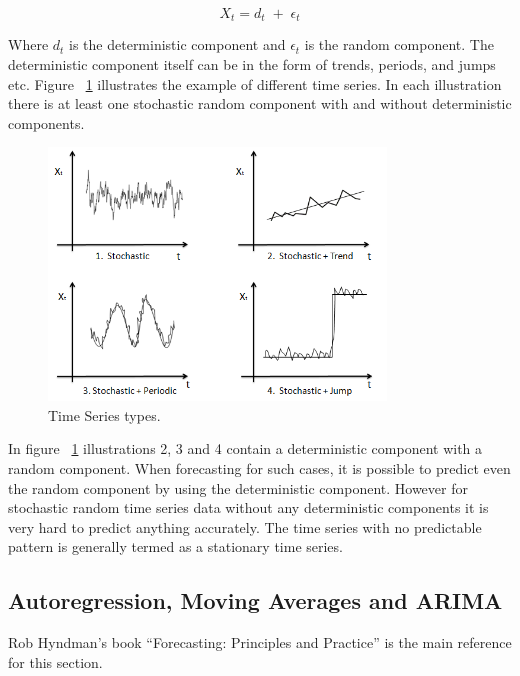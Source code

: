 \begin{equation}
X_{t}= d_{t}\;+\;\epsilon_{t} 
\end{equation}  

Where \(d_{t}\) is the deterministic component and \(\epsilon_{t}\) is the random component. The deterministic component itself can be in the form of trends, periods, and jumps etc. Figure ~\ref{fig:time_series} illustrates the example of different time series. In each illustration there is at least one stochastic random component with and without deterministic components. 
\begin{figure}[ht]
  \begin{center}
    \includegraphics[width=0.8\textwidth]{images/time_series.png}
    \caption{ Time Series types\cite{mujumdarstochastic}.}
    \label{fig:time_series}
  \end{center}
\end{figure}  

In figure ~\ref{fig:time_series} illustrations 2, 3 and 4 contain a deterministic component with a random component. When forecasting for such cases, it is possible to predict even the random component by using the deterministic component. However for stochastic random time series data without any deterministic components it is very hard to predict anything accurately. The time series with no predictable pattern is generally termed as a stationary time series. 
 
\subsection{Autoregression, Moving Averages and ARIMA} \label{ARIMA}    
 Rob Hyndman's book ``Forecasting: Principles and Practice''\cite{hyndman2014forecasting} is the main reference for this section. 

